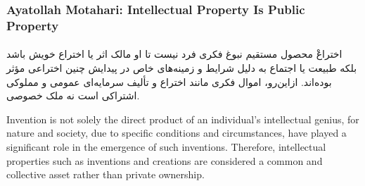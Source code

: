 \begin{whenOrg}
\begin{verblatex}

\begin{frame}[fragile,plain,label=ayatollahMotahari]
    \frametitle{Ayatollah Motahari: Intellectual Property Is Public Property}
    \framesubtitle{}



\RTL
  \begin{faPar}

    اختراعْ محصول مستقیم نبوغ فکری فرد نیست تا او مالک اثر یا
    اختراع خویش باشد بلکه طبیعت یا اجتماع به دلیل شرایط و
    زمینه‌های خاص در پیدایش چنین اختراعی مؤثر بوده‌اند. ازاین‌رو،
    اموال فکری مانند اختراع و تألیف سرمایه‌ای عمومی و مملوکی
    اشتراکی است نه ملک خصوصی.


  \end{faPar}
\LTR

\bigskip

    Invention is not solely the direct product of an individual's
    intellectual genius, for nature and society, due to specific
    conditions and circumstances, have played a significant role
    in the emergence of such inventions. Therefore, intellectual
    properties such as inventions and creations are considered a
    common and collective asset rather than private ownership.




\end{frame}
\end{verblatex}
\end{whenOrg}
